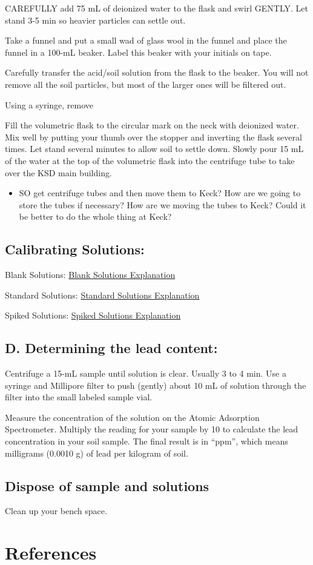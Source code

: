 \documentclass[12pt]{../SOP3_alpha}
\begin{document}
\NP CAREFULLY add 75 mL of deionized water to the flask and swirl GENTLY. Let stand 3-5 min so heavier particles can  settle out.

\NP Take a funnel and put a small wad of glass wool in the funnel and place the funnel in a 100-mL beaker. Label this beaker with your initials on tape.

\NP Carefully transfer the acid/soil solution from the flask to the beaker. You will not remove all the soil particles, but most of the larger ones will be filtered out.

\NP Using a syringe, remove 
    
 
\NP Fill the volumetric flask to the circular mark on the neck with deionized water. Mix well by putting your thumb over the stopper and inverting the flask several times. Let stand several minutes to allow soil to settle down. Slowly pour 15 mL of the water at the top of the volumetric flask into the centrifuge tube to take over the KSD main building.


    \begin{itemize}
      \item SO get centrifuge tubes and then move them to Keck?
  How are we going to store the tubes if necessary?
  How are we moving the tubes to Keck?
  Could it be better to do the whole thing at Keck?
    \end{itemize}  

\subsection{Calibrating Solutions:}

\NP Blank Solutions: \href{https://en.wikipedia.org/wiki/Blank_(solution)}{Blank Solutions Explanation}

\NP Standard Solutions: \href{https://en.wikipedia.org/wiki/Standard_solution}{Standard Solutions Explanation}

\NP Spiked Solutions: \href{}{Spiked Solutions Explanation}

  
\subsection{D. Determining the lead content:}

\NP Centrifuge a 15-mL sample until solution is clear. Usually 3 to 4 min. Use a syringe and Millipore filter to push (gently) about 10 mL of solution through the filter into the small labeled sample vial.

\NP Measure the concentration of the solution on the Atomic Adsorption Spectrometer.  Multiply the reading for your sample by 10 to calculate the lead concentration in your soil sample.  The final result is in “ppm”, which means milligrams (0.0010 g) of lead per kilogram of soil.


\subsection{Dispose of sample and solutions}

\NP Clean up your bench space.

\section{References}


\end{document}
